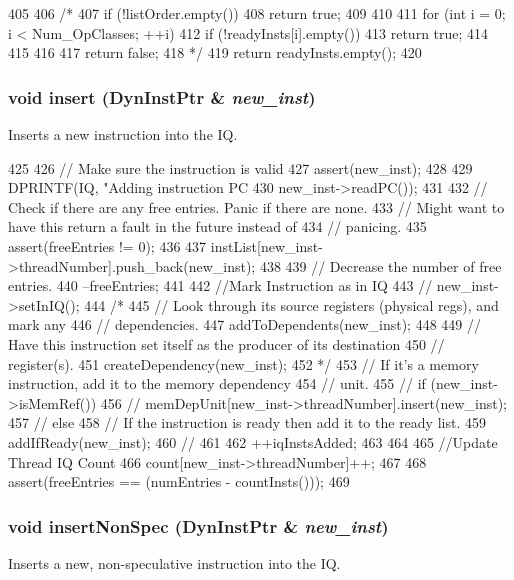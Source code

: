 \begin{DoxyCode}
405 {
406 /*
407     if (!listOrder.empty()) {
408         return true;
409     }
410 
411     for (int i = 0; i < Num_OpClasses; ++i) {
412         if (!readyInsts[i].empty()) {
413             return true;
414         }
415     }
416 
417     return false;
418 */
419     return readyInsts.empty();
420 }
\end{DoxyCode}
\hypertarget{classInstQueue_a786595aecf8ab7aae40868b5ac4a79a7}{
\subsubsection[{insert}]{\setlength{\rightskip}{0pt plus 5cm}void insert ({\bf DynInstPtr} \& {\em new\_\-inst})}}
\label{classInstQueue_a786595aecf8ab7aae40868b5ac4a79a7}
Inserts a new instruction into the IQ. 


\begin{DoxyCode}
425 {
426     // Make sure the instruction is valid
427     assert(new_inst);
428 
429     DPRINTF(IQ, "Adding instruction PC %
430             new_inst->readPC());
431 
432     // Check if there are any free entries.  Panic if there are none.
433     // Might want to have this return a fault in the future instead of
434     // panicing.
435     assert(freeEntries != 0);
436 
437     instList[new_inst->threadNumber].push_back(new_inst);
438 
439     // Decrease the number of free entries.
440     --freeEntries;
441 
442     //Mark Instruction as in IQ
443 //    new_inst->setInIQ();
444 /*
445     // Look through its source registers (physical regs), and mark any
446     // dependencies.
447     addToDependents(new_inst);
448 
449     // Have this instruction set itself as the producer of its destination
450     // register(s).
451     createDependency(new_inst);
452 */
453     // If it's a memory instruction, add it to the memory dependency
454     // unit.
455 //    if (new_inst->isMemRef()) {
456 //        memDepUnit[new_inst->threadNumber].insert(new_inst);
457 //    } else {
458         // If the instruction is ready then add it to the ready list.
459         addIfReady(new_inst);
460 //    }
461 
462     ++iqInstsAdded;
463 
464 
465     //Update Thread IQ Count
466     count[new_inst->threadNumber]++;
467 
468     assert(freeEntries == (numEntries - countInsts()));
469 }
\end{DoxyCode}
\hypertarget{classInstQueue_a4f7523e76440d88096a4eac14f2e0dd3}{
\subsubsection[{insertNonSpec}]{\setlength{\rightskip}{0pt plus 5cm}void insertNonSpec ({\bf DynInstPtr} \& {\em new\_\-inst})}}
\label{classInstQueue_a4f7523e76440d88096a4eac14f2e0dd3}
Inserts a new, non-\/speculative instruction into the IQ. 


